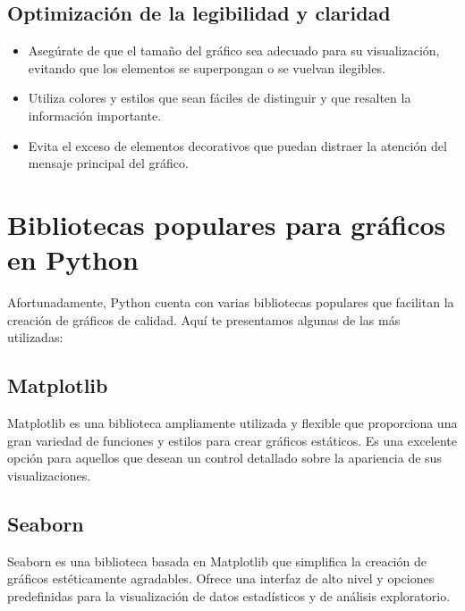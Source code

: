 \documentclass[
  a4paper,
]{article}
\providecommand{\tightlist}{%
  \setlength{\itemsep}{0pt}\setlength{\parskip}{0pt}}\usepackage{longtable,booktabs,array}
\begin{document}
\hypertarget{optimizaciuxf3n-de-la-legibilidad-y-claridad}{%
\subsection{Optimización de la legibilidad y
claridad}\label{optimizaciuxf3n-de-la-legibilidad-y-claridad}}

\begin{itemize}
\tightlist
\item
  Asegúrate de que el tamaño del gráfico sea adecuado para su
  visualización, evitando que los elementos se superpongan o se vuelvan
  ilegibles.
\item
  Utiliza colores y estilos que sean fáciles de distinguir y que
  resalten la información importante.
\item
  Evita el exceso de elementos decorativos que puedan distraer la
  atención del mensaje principal del gráfico.
\end{itemize}

\hypertarget{bibliotecas-populares-para-gruxe1ficos-en-python}{%
\section{Bibliotecas populares para gráficos en
Python}\label{bibliotecas-populares-para-gruxe1ficos-en-python}}

Afortunadamente, Python cuenta con varias bibliotecas populares que
facilitan la creación de gráficos de calidad. Aquí te presentamos
algunas de las más utilizadas:

\hypertarget{matplotlib-1}{%
\subsection{Matplotlib}\label{matplotlib-1}}

Matplotlib es una biblioteca ampliamente utilizada y flexible que
proporciona una gran variedad de funciones y estilos para crear gráficos
estáticos. Es una excelente opción para aquellos que desean un control
detallado sobre la apariencia de sus visualizaciones.

\hypertarget{seaborn}{%
\subsection{Seaborn}\label{seaborn}}

Seaborn es una biblioteca basada en Matplotlib que simplifica la
creación de gráficos estéticamente agradables. Ofrece una interfaz de
alto nivel y opciones predefinidas para la visualización de datos
estadísticos y de análisis exploratorio.
\end{document}
